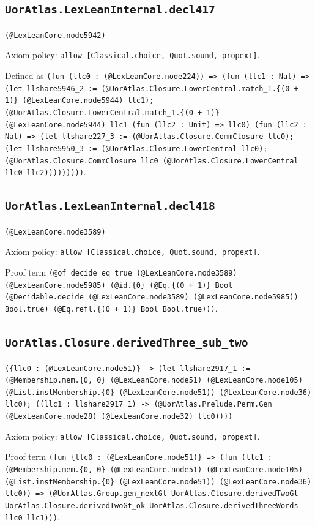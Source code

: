 \documentclass[11pt]{article}
\begin{document}
\subsection*{\texttt{UorAtlas.LexLeanInternal.decl417}}
\noindent\texttt{(@LexLeanCore.node5942)}\par
\noindent Axiom policy: \texttt{allow [Classical.choice, Quot.sound, propext]}.\par
\noindent Defined as \texttt{(fun (llc0 : (@LexLeanCore.node224)) => (fun (llc1 : Nat) => (let llshare5946\_2 := (@UorAtlas.Closure.LowerCentral.match\_1.\{(0 + 1)\} (@LexLeanCore.node5944) llc1); (@UorAtlas.Closure.LowerCentral.match\_1.\{(0 + 1)\} (@LexLeanCore.node5944) llc1 (fun (llc2 : Unit) => llc0) (fun (llc2 : Nat) => (let llshare227\_3 := (@UorAtlas.Closure.CommClosure llc0); (let llshare5950\_3 := (@UorAtlas.Closure.LowerCentral llc0); (@UorAtlas.Closure.CommClosure llc0 (@UorAtlas.Closure.LowerCentral llc0 llc2)))))))))}.\par
\subsection*{\texttt{UorAtlas.LexLeanInternal.decl418}}
\noindent\texttt{(@LexLeanCore.node3589)}\par
\noindent Axiom policy: \texttt{allow [Classical.choice, Quot.sound, propext]}.\par
\noindent Proof term \texttt{(@of\_decide\_eq\_true (@LexLeanCore.node3589) (@LexLeanCore.node5985) (@id.\{0\} (@Eq.\{(0 + 1)\} Bool (@Decidable.decide (@LexLeanCore.node3589) (@LexLeanCore.node5985)) Bool.true) (@Eq.refl.\{(0 + 1)\} Bool Bool.true)))}.\par
\subsection*{\texttt{UorAtlas.Closure.derivedThree\_sub\_two}}
\noindent\texttt{(\{llc0 : (@LexLeanCore.node51)\} -> (let llshare2917\_1 := (@Membership.mem.\{0, 0\} (@LexLeanCore.node51) (@LexLeanCore.node105) (@List.instMembership.\{0\} (@LexLeanCore.node51)) (@LexLeanCore.node36) llc0); ((llc1 : llshare2917\_1) -> (@UorAtlas.Prelude.Perm.Gen (@LexLeanCore.node28) (@LexLeanCore.node32) llc0))))}\par
\noindent Axiom policy: \texttt{allow [Classical.choice, Quot.sound, propext]}.\par
\noindent Proof term \texttt{(fun \{llc0 : (@LexLeanCore.node51)\} => (fun (llc1 : (@Membership.mem.\{0, 0\} (@LexLeanCore.node51) (@LexLeanCore.node105) (@List.instMembership.\{0\} (@LexLeanCore.node51)) (@LexLeanCore.node36) llc0)) => (@UorAtlas.Group.gen\_nextGt UorAtlas.Closure.derivedTwoGt UorAtlas.Closure.derivedTwoGt\_ok UorAtlas.Closure.derivedThreeWords llc0 llc1)))}.\par
\end{document}
